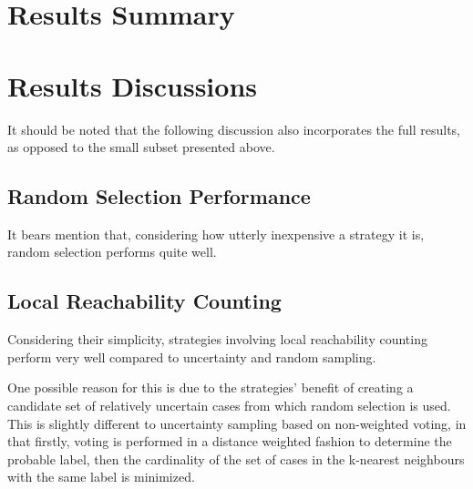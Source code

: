 \documentclass[a4paper,11pt]{report}
\begin{document}

\section{Results Summary}
\resizebox{\textwidth}{!} {
}

\section{Results Discussions}
It should be noted that the following discussion also incorporates the full results, as opposed to the small subset presented above.

\subsection{Random Selection Performance}
It bears mention that, considering how utterly inexpensive a strategy it is, random selection performs quite well. 

\subsection{Local Reachability Counting}
Considering their simplicity, strategies involving local reachability counting perform very well compared to uncertainty and random sampling. 

One possible reason for this is due to the strategies' benefit of creating a candidate set of relatively uncertain cases from which random selection is used. This is slightly different to uncertainty sampling based on non-weighted voting, in that firstly, voting is performed in a distance weighted fashion to determine the probable label, then the cardinality of the set of cases in the k-nearest neighbours with the same label is minimized.
\end{document}
